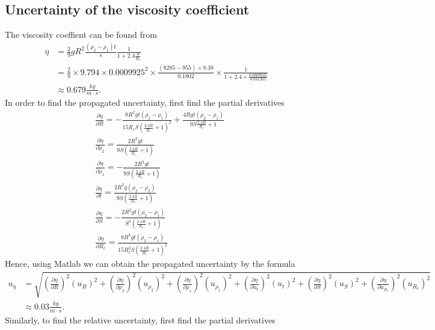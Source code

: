 \subsection{Uncertainty of the viscosity coefficient}
    The viscosity coeffient can be found from
    \[
    \begin{split}
        \eta&=\frac{2}{9}gR^2\frac{(\rho_2-\rho_1)t}{s}\frac{1}{1+2.4\frac{R}{R_c}}\\
            &=\frac{2}{9}\times 9.794\times 0.0009925^2\times \frac{(8285-955)\times 8.38}{0.1802}\times \frac{1}{1+2.4\times \frac{0.0009925}{0.031205}}\\
            &\approx 0.679\frac{kg}{m\cdot s}.
    \end{split}
    \]
    In order to find the propagated uncertainty, first find the partial derivatives
    \[
    \begin{split}
        &\frac{\partial\eta}{\partial R}=- \frac{8R^{2}gt(\rho_2-\rho_1)}{15R_{c}S(\frac{2.4R}{R_{c}}+1)^2} + \frac{4Rgt(\rho_2-\rho_1)}{9S\frac{2.4R}{R_{c}}+1}\\
        &\frac{\partial\eta}{\partial \rho_2}=\frac{2R^{2} g t}{9S(\frac{2.4 R}{R_{c}} + 1)}\\
        &\frac{\partial\eta}{\partial \rho_1}=-\frac{2R^{2} g t}{9S(\frac{2.4 R}{R_{c}} + 1)}\\
        &\frac{\partial\eta}{\partial t}=\frac{2R^2 g (\rho_2-\rho_2)}{9S (\frac{2.4 R}{R_{c}}+1)}\\
        &\frac{\partial\eta}{\partial S}=-\frac{2R^2 g t (\rho_{2} - \rho_{1})}{S^{2} (\frac{2.4 R}{R_{c}} + 1)}\\
        &\frac{\partial\eta}{\partial R_c}=\frac{8R^{3} g t (\rho_{2} - \rho_{1})}{15R_{c}^{2} S (\frac{2.4 R}{R_{c}} + 1)^{2}}
    \end{split}
    \]
    Hence, using Matlab we can obtain the propagated uncertainty by the formula
    \[
    \begin{split}
        u_{\eta}&=\sqrt{(\frac{\partial\eta}{\partial R})^2(u_R)^2+(\frac{\partial\eta}{\partial \rho_2})^2(u_{\rho_2})^2+(\frac{\partial\eta}{\partial \rho_1})^2(u_{\rho_1})^2+(\frac{\partial\eta}{\partial u_t})^2(u_t)^2+(\frac{\partial\eta}{\partial S})^2(u_S)^2+(\frac{\partial\eta}{\partial u_{R_c}})^2(u_{R_c})^2}\\
        &\approx 0.03\frac{kg}{m\cdot s}.
    \end{split}
    \]
    Similarly, to find the relative uncertainty, first find the partial derivatives
